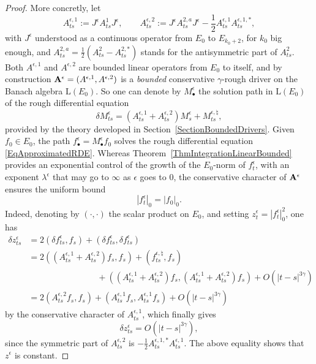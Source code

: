 \documentclass[11pt,a4paper]{amsart}
\theoremstyle{plain}%
\theoremstyle{definition}
\theoremstyle{remark}
\numberwithin{equation}{section} %
\begin{document}
\begin{proof}
More concretly, let 
$$
A^{\epsilon,1}_{ts} := J^\epsilon A^1_{ts}J^\epsilon,\quad\quad A^{\epsilon,2}_{ts} := J^\epsilon A^{2,a}_{ts}J^\epsilon - \frac1 2 A^{\epsilon,1}_{ts} A^{\epsilon,1,*}_{ts},
$$
with $J^\epsilon$ understood as a continuous operator from $E_0$ to $E_{k_0+2}$, for $k_0$ big enough, and $A^{2,a}_{ts} = \frac{1}{2}(A^2_{ts}-A^{2,*}_{ts})$ stands for the antisymmetric part of $A^{2}_{ts}$. Both $A^{\epsilon,1}$ and $A^{\epsilon,2}$ are bounded linear operators from $E_0$ to itself, and by construction ${\bf A}^\epsilon = (A^{\epsilon,1},A^{\epsilon,2})$ is a \emph{bounded} conservative $\gamma$-rough driver on the Banach algebra $\textrm{L}(E_0)$. So one can denote by $M^\epsilon_\bullet$ the solution path in $\textrm{L}(E_0)$ of the rough differential equation
$$
\delta M^\epsilon_{ts} = (A^{\epsilon,1}_{ts} + A^{\epsilon,2}_{ts})M^\epsilon_s + M^{\epsilon,\natural}_{ts},
$$
provided by the theory developed in Section~\ref{SectionBoundedDrivers}. Given $f_0\in E_0$, the path $f^\epsilon_\bullet = M^\epsilon_\bullet f_0$ solves the rough differential equation \eqref{EqApproximatedRDE}. Whereas Theorem~\ref{ThmIntegrationLinearBounded} provides an exponential control of the growth of the $E_0$-norm of $f^\epsilon_t$, with an exponent $\lambda^\epsilon$ that may go to $\infty$ as $\epsilon$ goes to $0$, the conservative character of ${\bf A}^\epsilon$ ensures the uniform bound
\begin{equation*}
| f^\epsilon_t|_0 = | f_0|_0.
\end{equation*}
Indeed, denoting by $(\cdot,\cdot)$ the scalar product on $E_0$, and setting $z^\epsilon_t = |f^\epsilon_t|^2_0$, one has
\begin{equation*}
\begin{split}
\delta z^\epsilon_{ts} &= 2(\delta f^\epsilon_{ts},f_s) + (\delta f^\epsilon_{ts}, \delta f^\epsilon_{ts}) \\
                                    &= 2((A^{\epsilon,1}_{ts}+A^{\epsilon,2}_{ts})f_s , f_s) + (f^{\epsilon,\natural}_{ts},f_s) \\
                                    &\quad\quad\quad\quad\quad\quad\quad\quad+ ((A^{\epsilon,1}_{ts}+A^{\epsilon,2}_{ts})f_s , (A^{\epsilon,1}_{ts}+A^{\epsilon,2}_{ts})f_s) + O(|t-s|^{3\gamma}) \\
                                    &= 2(A^{\epsilon,2}_{ts}f_s , f_s) + (A^{\epsilon,1}_{ts}f_s , A^{\epsilon,1}_{ts}f_s) + O(|t-s|^{3\gamma})
\end{split}
\end{equation*} 
by the conservative character of $A^{\epsilon,1}_{ts}$, which finally gives
$$
\delta z^\epsilon_{ts} = O(|t-s|^{3\gamma}),
$$
since the symmetric part of $A^{\epsilon,2}_{ts}$ is $-\frac{1}{2}A^{\epsilon,1,*}_{ts}A^{\epsilon,1}_{ts}$. The above equality shows that $z^\epsilon$ is constant.


\end{proof}
\end{document}
